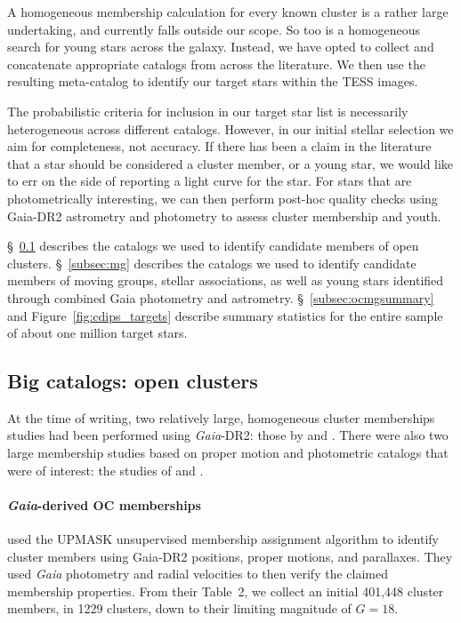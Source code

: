 \documentclass[12pt,twocolumn,tighten]{aastex62}
\begin{document}
A homogeneous membership calculation for every known cluster is a
rather large undertaking, and currently falls outside our scope.  So
too is a homogeneous search for young stars across the galaxy.
Instead, we have opted to collect and concatenate appropriate catalogs
from across the literature.  We then use the resulting meta-catalog to
identify our target stars within the TESS images.

The probabilistic criteria for inclusion in our target star list is
necessarily heterogeneous across different catalogs.  However, in our
initial stellar selection we aim for completeness, not accuracy.  If
there has been a claim in the literature that a star should be
considered a cluster member, or a young star, we would like to err on
the side of reporting a light curve for the star.  For stars that are
photometrically interesting, we can then perform post-hoc quality
checks using Gaia-DR2 astrometry and photometry to assess cluster
membership and youth.

\S~\ref{subsec:oc} describes the catalogs we used to identify
candidate members of open clusters.  \S~\ref{subsec:mg} describes the
catalogs we used to identify candidate members of moving groups,
stellar associations, as well as young stars identified through
combined Gaia photometry and astrometry.  \S~\ref{subsec:ocmgsummary}
and Figure~\ref{fig:cdips_targets} describe summary statistics for the
entire sample of about one million target stars.


\subsection{Big catalogs: open clusters}
\label{subsec:oc}

At the time of writing, two relatively large, homogeneous cluster
memberships studies had been performed using {\it Gaia}-DR2: those by
\citet{cantat-gaudin_gaia_2018} and \citet{gaia_hr_2018}.
There were also two large membership studies based on proper motion and 
photometric catalogs that were of interest: the studies of
\citet{Kharchenko_et_al_2013} and \citet{dias_proper_2014}.

\paragraph{{\it Gaia}-derived OC memberships}

\citet{cantat-gaudin_gaia_2018} used the UPMASK unsupervised membership
assignment algorithm \citep{krone-martins_upmask_2014} to identify cluster
members using Gaia-DR2 positions, proper motions, and parallaxes.
They used {\it Gaia} photometry and radial velocities to then verify the
claimed membership properties.  From their Table~2, we collect an initial
401{,}448 cluster members, in 1229 clusters, down to their limiting magnitude
of $G=18$.
\end{document}
